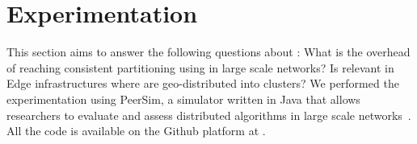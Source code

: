 
\newcommand{\FIGSCALE}{0.99}

\section{Experimentation}
\label{sec:experimentation}

This section aims to answer the following questions about \NAME: What
is the overhead of reaching consistent partitioning using \NAME in
large scale networks?  Is \NAME relevant in Edge infrastructures where
\processes are geo-distributed into clusters? We performed the
experimentation using PeerSim, a simulator written in Java that allows
researchers to evaluate and assess distributed algorithms in large
scale networks~\cite{montresor2009peersim}. All the code is available
on the Github platform at
.


